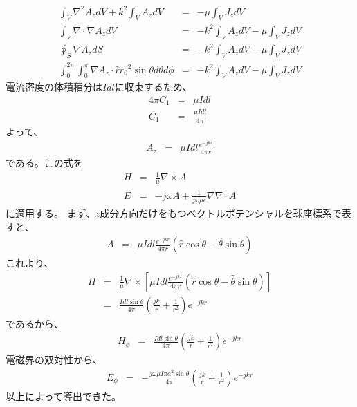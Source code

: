\documentclass{article}
\begin{document}
\begin{eqnarray*}
\int_V \nabla^2 A_z dV + k^2 \int_V A_z dV &=& -\mu \int_V J_z dV\\
\int_V\nabla\cdot\nabla A_z dV &=& -k^2 \int_V A_z dV - \mu \int_V J_z dV\\
\oint_S \nabla A_z dS &=& -k^2 \int_V A_z dV - \mu \int_V J_z dV\\
\int_0^{2\pi} \int_0^\pi \nabla A_z \cdot \hat{r} {r_0}^2\sin{\theta}d\theta d\phi &=& -k^2 \int_V A_z dV - \mu \int_V J_z dV
\end{eqnarray*}
電流密度の体積積分は$Idl$に収束するため、
\begin{eqnarray*}
4\pi C_1 &=& \mu Idl\\
C_1 &=& \frac{\mu Idl}{4\pi}
\end{eqnarray*}
よって、
\begin{eqnarray*}
A_z &=& \mu Idl \frac{e^{-jkr}}{4\pi r}
\end{eqnarray*}
である。この式を
\begin{eqnarray*}
H &=& \frac{1}{\mu}\nabla \times A\\
E &=& -j\omega A + \frac{1}{j\omega \mu \epsilon}\nabla\nabla\cdot A
\end{eqnarray*}
に適用する。
まず、$z$成分方向だけをもつベクトルポテンシャルを球座標系で表すと、
\begin{eqnarray*}
A&=& \mu Idl \frac{e^{-jkr}}{4\pi r }(\hat{r}\cos\theta - \hat{\theta}\sin\theta)
\end{eqnarray*}
これより、
\begin{eqnarray*}
H &=& \frac{1}{\mu}\nabla\times [\mu Idl \frac{e^{-jkr}}{4\pi r }(\hat{r}\cos\theta - \hat{\theta}\sin\theta)]\\
&=&\frac{Idl \sin\theta}{4\pi}(\frac{jk}{r}+ \frac{1}{r^2})e^{-jkr}
\end{eqnarray*}
であるから、
\begin{eqnarray*}
H_{\phi}&=& \frac{Idl \sin\theta}{4\pi}(\frac{jk}{r}+ \frac{1}{r^2})e^{-jkr}
\end{eqnarray*}
電磁界の双対性から、
\begin{eqnarray*}
E_{\phi}&=& -\frac{j\omega \mu I \pi a^2 \sin\theta}{4\pi}(\frac{jk}{r} + \frac{1}{r^2})e^{-jkr}
\end{eqnarray*}
以上によって導出できた。
\end{document}
